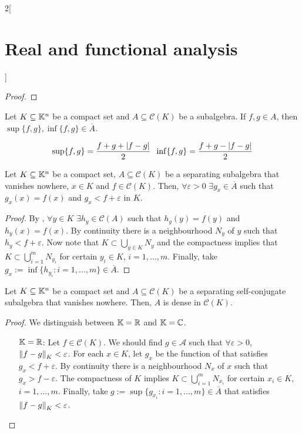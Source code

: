\documentclass[../../../main_math.tex]{subfiles}
\begin{document}
\begin{multicols}{2}[\section{Real and functional analysis}]
\begin{proof}
  \end{proof}
  \begin{corollary}
    Let $K\subseteq \mathbb{K}^n$ be a compact set and $A\subseteq \mathcal{C}(K)$ be a subalgebra. If $f,g\in A$, then $\sup\{f,g\}, \inf\{f,g\}\in \overline{A}$.
  \end{corollary}
  \begin{sproof}
    $$\sup\{f,g\}=\frac{f+g+\abs{f-g}}{2}\;\;\inf\{f,g\}=\frac{f+g-\abs{f-g}}{2}$$
  \end{sproof}
  \begin{lemma}\label{RFA:lemmaStone}
    Let $K\subseteq \mathbb{K}^n$ be a compact set, $A\subseteq \mathcal{C}(K)$ be a separating subalgebra that vanishes nowhere, $x\in K$ and $f\in\mathcal{C}(K)$. Then, $\forall \varepsilon>0$ $\exists g_x\in\overline{A}$ such that $g_x(x)=f(x)$ and $g_x<f+\varepsilon$ in $K$.
  \end{lemma}
  \begin{proof}
    By , $\forall y\in K$ $\exists h_y\in\mathcal{C}(A)$ such that $h_y(y)=f(y)$ and $h_y(x)=f(x)$. By continuity there is a neighbourhood $N_y$ of $y$ such that $h_y<f+\varepsilon$. Now note that $K\subset\bigcup_{y\in K}N_y$ and the compactness implies that $K\subset\bigcup_{i=1}^mN_{y_i}$ for certain $y_i\in K$, $i=1,\ldots,m$. Finally, take $g_x:=\inf\{h_{y_i}:i=1,\ldots,m\}\in\overline{A}$.
  \end{proof}
  \begin{important}
    \begin{theorem}
      Let $K\subseteq \mathbb{K}^n$ be a compact set and $A\subseteq \mathcal{C}(K)$ be a separating self-conjugate subalgebra that vanishes nowhere. Then, $A$ is dense in $\mathcal{C}(K)$.
    \end{theorem}
  \end{important}
  \begin{proof}
    We distinguish between $\mathbb{K}=\mathbb{R}$ and $\mathbb{K}=\mathbb{C}$.
    \begin{itemize}[leftmargin=1.3cm]
      \item[$\mathbb{K}=\mathbb{R}$:] Let $f\in\mathcal{C}(K)$. We should find $g\in\mathcal{A}$ such that $\forall \varepsilon>0$, $\left\|f-g\right\|_K<\varepsilon$. For each $x\in K$, let $g_x$ be the function of  that satisfies $g_x<f+\varepsilon$. By continuity there is a neighbourhood $N_x$ of $x$ such that $g_x>f-\varepsilon$. The compactness of $K$ implies $K\subset\bigcup_{i=1}^mN_{x_i}$ for certain $x_i\in K$, $i=1,\ldots,m$. Finally, take $g:=\sup\{g_{x_i}:i=1,\ldots,m\}\in\overline{A}$ that satisfies $\left\|f-g\right\|_K<\varepsilon$.

\end{itemize}
\end{proof}
\end{multicols}
\end{document}
